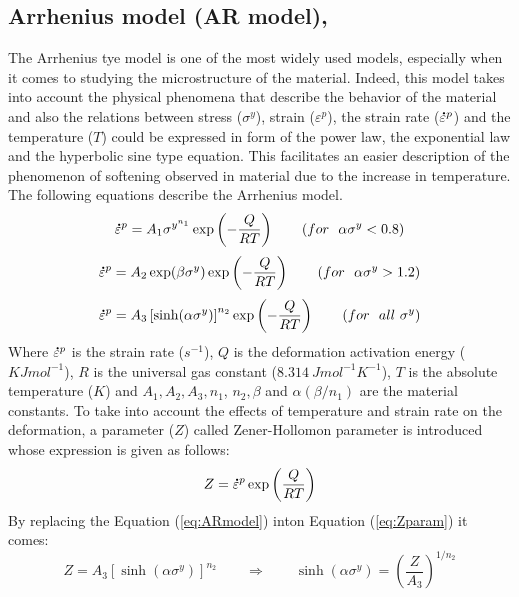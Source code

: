 \documentclass[twoside,english,1p,final,sort&compress]{elsarticle}
\theoremstyle{plain}
\newcommand{\mdot}[1]{\accentset{\mbox{\bfseries .}}{#1}}
\begin{document}
\subsection{Arrhenius model (AR model), \label{sec:ARmodel}}
The Arrhenius tye model is one of the most widely used models, especially when it comes to studying the microstructure of the material. Indeed, this model takes into account the physical phenomena that describe the behavior of the material and also the relations between stress ($\sigma^y$), strain ($\varepsilon^p$), the strain rate ($\mdot\varepsilon^p$) and the temperature ($T$) could be expressed in form of the power law, the exponential law and the hyperbolic sine type equation. This facilitates an easier description of the phenomenon of softening observed in material due to the increase in temperature. The following equations describe the Arrhenius model.
\begin{equation}
\label{eq:ARmodel1}
\mdot\varepsilon^p = A_1\sigma^{y^{n_1}}\exp\left(-\frac{Q}{RT}\right) \qquad (for ~~\alpha\sigma^y < 0.8)
\end{equation}
\begin{equation}
\label{eq:ARmodel2}
\mdot\varepsilon^p = A_2\exp(\beta\sigma^y)\exp\left(-\frac{Q}{RT}\right) \qquad (for ~~\alpha\sigma^y > 1.2)
\end{equation}
\begin{equation}
\label{eq:ARmodel}
\mdot\varepsilon^p = A_3\left[\sinh(\alpha\sigma^y)\right]^{n_2}\exp\left(-\frac{Q}{RT}\right) \qquad (for ~~all\ \sigma^y)
\end{equation}
Where $\mdot\varepsilon^p$ is the strain rate ($s^{-1}$), $Q$ is the deformation activation energy ($KJmol^{-1}$), $R$ is the universal gas constant ($8.314\ J mol^{-1} K^{-1}$), $T$ is the absolute temperature ($K$) and $A_1, A_2, A_3, n_1$, $n_2, \beta$ and $\alpha(\beta/n_1)$ are the material constants. To take into account the effects of temperature and strain rate on the deformation, a parameter ($Z$) called Zener-Hollomon parameter is introduced whose expression is given as follows:
\begin{equation}
\label{eq:Zparam}
Z = \mdot\varepsilon^p\exp\left(\frac{Q}{RT}\right)
\end{equation}
By replacing the Equation (\ref{eq:ARmodel}) inton Equation (\ref{eq:Zparam}) it comes:
\begin{equation}
\label{eq:Zparam1}
Z = A_3\left[\sinh(\alpha\sigma^y)\right]^{n_2} \qquad \Rightarrow \qquad \sinh(\alpha\sigma^y) = \left(\frac{Z}{A_3}\right)^{1/n_2}
\end{equation}
\end{document}
